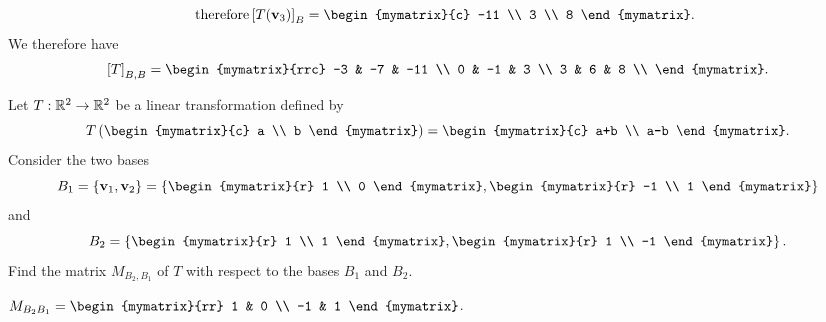 \begin{ex}
\begin{sol}
\begin{enumerate}
\begin{equation*}
          \quad\mbox{therefore}
          \coord{T(\vect{v}_3)}_B =
          \begin{mymatrix}{c} -11 \\ 3 \\ 8 \end{mymatrix}.
        \end{equation*}
        We therefore have
        \begin{equation*}
          \coord{T}_{B,B} =
          \begin{mymatrix}{rrc}
            -3 & -7 & -11 \\
            0  & -1 &   3 \\
            3  &  6 &   8 \\
          \end{mymatrix}.
        \end{equation*}
      \end{enumerate}
\end{sol}
\end{ex}

\begin{ex}
  Let $T: \mathbb{R}^2 \to \mathbb{R}^2$ be a linear transformation defined by
  \begin{equation*}
    T \paren{\begin{mymatrix}{c} a \\ b \end{mymatrix}}
    = \begin{mymatrix}{c} a+b \\ a-b \end{mymatrix}.
  \end{equation*}
  Consider the two bases
  \begin{equation*}
    B_1 = \set{\vect{v}_1, \vect{v}_2}
    = \set{\begin{mymatrix}{r} 1 \\ 0 \end{mymatrix},
      \begin{mymatrix}{r} -1 \\ 1 \end{mymatrix}
    }
  \end{equation*}
  and
  \begin{equation*}
    B_2 = \set{\begin{mymatrix}{r} 1 \\ 1 \end{mymatrix},
      \begin{mymatrix}{r} 1 \\ -1 \end{mymatrix}
    }.
  \end{equation*}
  Find the matrix $M_{B_2,B_1}$ of $T$ with respect to the bases $B_1$
  and $B_2$.
  \begin{sol}
    $M_{B_2 B_1} = \begin{mymatrix}{rr}
      1 & 0 \\
      -1 & 1
    \end{mymatrix}$.
  \end{sol}
\end{ex}

